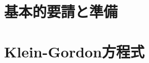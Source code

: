 \documentclass{report}
\begin{document}
  \chapter{基本的要請と準備}
    
  \chapter{Klein-Gordon方程式}
\end{document}
